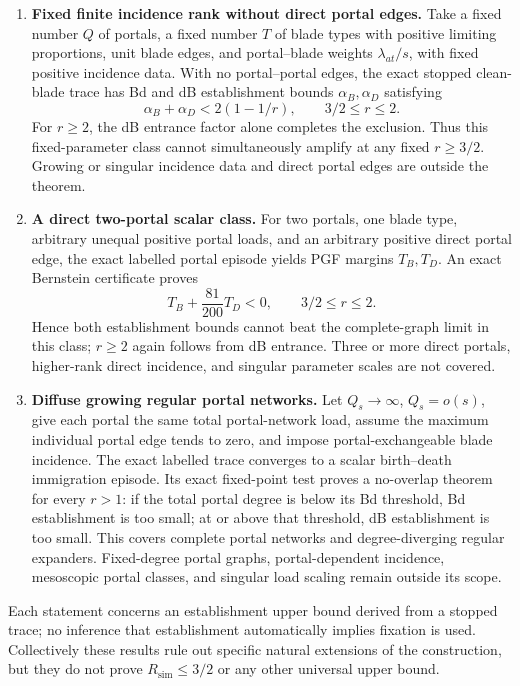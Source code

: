 \documentclass[11pt]{article}
\theoremstyle{definition}
\theoremstyle{remark}
\begin{document}
\begin{enumerate}
\item \textbf{Fixed finite incidence rank without direct portal edges.}
Take a fixed number $Q$ of portals, a fixed number $T$ of blade types with
positive limiting proportions, unit blade edges, and portal--blade weights
$\lambda_{at}/s$, with fixed positive incidence data.  With no
portal--portal edges, the exact stopped clean-blade trace has Bd and dB
establishment bounds $\alpha_B,\alpha_D$ satisfying
\[
 \alpha_B+\alpha_D<2(1-1/r),\qquad 3/2\leq r\leq2.
\]
For $r\geq2$, the dB entrance factor alone completes the exclusion.  Thus
this fixed-parameter class cannot simultaneously amplify at any fixed
$r\geq3/2$.  Growing or singular incidence data and direct portal edges are
outside the theorem.

\item \textbf{A direct two-portal scalar class.}
For two portals, one blade type, arbitrary unequal positive portal loads,
and an arbitrary positive direct portal edge, the exact labelled portal
episode yields PGF margins $T_B,T_D$.  An exact Bernstein certificate proves
\[
 T_B+\frac{81}{200}T_D<0,\qquad 3/2\leq r\leq2.
\]
Hence both establishment bounds cannot beat the complete-graph limit in this
class; $r\geq2$ again follows from dB entrance.  Three or more direct portals,
higher-rank direct incidence, and singular parameter scales are not covered.

\item \textbf{Diffuse growing regular portal networks.}
Let $Q_s\to\infty$, $Q_s=o(s)$, give each portal the same total
portal-network load, assume the maximum individual portal edge tends to zero,
and impose portal-exchangeable blade incidence.  The exact labelled trace
converges to a scalar birth--death immigration episode.  Its exact fixed-point
test proves a no-overlap theorem for every $r>1$: if the total portal degree
is below its Bd threshold, Bd establishment is too small; at or above that
threshold, dB establishment is too small.  This covers complete portal
networks and degree-diverging regular expanders.  Fixed-degree portal graphs,
portal-dependent incidence, mesoscopic portal classes, and singular load
scaling remain outside its scope.
\end{enumerate}

Each statement concerns an establishment upper bound derived from a stopped
trace; no inference that establishment automatically implies fixation is
used.  Collectively these results rule out specific natural extensions of
the construction, but they do not prove $R_{\mathrm{sim}}\leq3/2$ or any
other universal upper bound.
\end{document}
